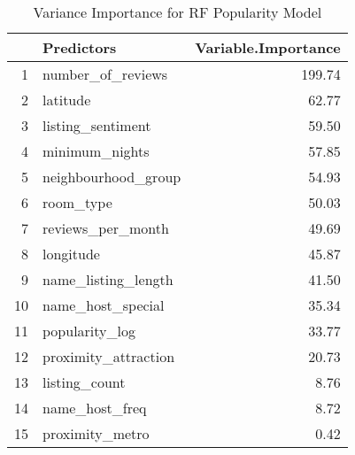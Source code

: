 \begin{table}[ht]
\centering
\begin{tabular}{rlr}
  \hline
 & Predictors & Variable.Importance \\ 
  \hline
1 & number\_of\_reviews & 199.74 \\ 
  2 & latitude & 62.77 \\ 
  3 & listing\_sentiment & 59.50 \\ 
  4 & minimum\_nights & 57.85 \\ 
  5 & neighbourhood\_group & 54.93 \\ 
  6 & room\_type & 50.03 \\ 
  7 & reviews\_per\_month & 49.69 \\ 
  8 & longitude & 45.87 \\ 
  9 & name\_listing\_length & 41.50 \\ 
  10 & name\_host\_special & 35.34 \\ 
  11 & popularity\_log & 33.77 \\ 
  12 & proximity\_attraction & 20.73 \\ 
  13 & listing\_count & 8.76 \\ 
  14 & name\_host\_freq & 8.72 \\ 
  15 & proximity\_metro & 0.42 \\ 
   \hline
\end{tabular}
\caption{Variance Importance for RF Popularity Model} 
\end{table}
